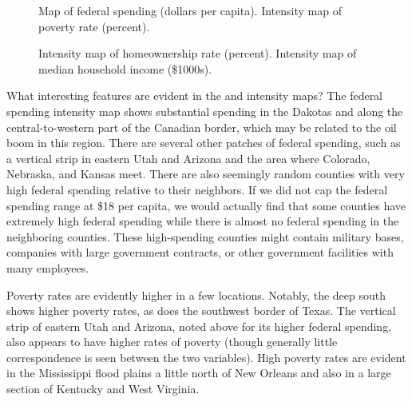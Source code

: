 \begin{figure}
\centering
{}
\caption{ Map of federal spending (dollars per capita).  Intensity map of poverty rate (percent).}
\label{countyIntensityMaps1}
\end{figure}

\begin{figure}
\centering
{}
\caption{ Intensity map of homeownership rate (percent).  Intensity map of median household income (\$1000s).}
\label{countyIntensityMaps2}
\end{figure}

\begin{example}{What interesting features are evident in the  and  intensity maps?}
The federal spending intensity map shows substantial spending in the Dakotas and along the central-to-western part of the Canadian border, which may be related to the oil boom in this region. There are several other patches of federal spending, such as a vertical strip in eastern Utah and Arizona and the area where Colorado, Nebraska, and Kansas meet. There are also seemingly random counties with very high federal spending relative to their neighbors. If we did not cap the federal spending range at \$18 per capita, we would actually find that some counties have extremely high federal spending while there is almost no federal spending in the neighboring counties. These high-spending counties might contain military bases, companies with large government contracts, or other government facilities with many employees.

Poverty rates are evidently higher in a few locations. Notably, the deep south shows higher poverty rates, as does the southwest border of Texas. The vertical strip of eastern Utah and Arizona, noted above for its higher federal spending, also appears to have higher rates of poverty (though generally little correspondence is seen between the two variables). High poverty rates are evident in the Mississippi flood plains a little north of New Orleans and also in a large section of Kentucky and West Virginia.
\end{example}

